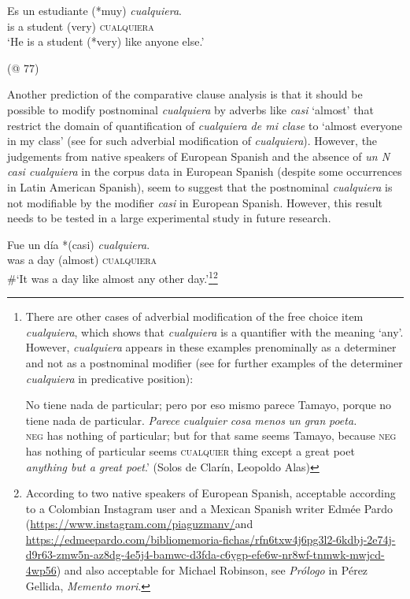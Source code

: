 {\ea \label{bkm:Ref58074686} %
\gll Es un estudiante (*muy) \textit{cualquiera}.\\
is a student (very) \textsc{cualquiera}\\
\glt ‘He is a student (*very) like anyone else.’

  (@ 77)
\z

\largerpage
Another prediction of the comparative clause analysis is that it should be possible to modify postnominal \textit{cualquiera} by adverbs like \textit{casi} ‘almost’ that restrict the domain of quantification of \textit{cualquiera de mi clase} to ‘almost everyone in my class’ (see  for such adverbial modification of \textit{cualquiera}). However, the judgements from native speakers of European Spanish and the absence of \textit{un N casi cualquiera} in the corpus data in European Spanish (despite some occurrences in Latin American Spanish), seem to suggest that the postnominal \textit{cualquiera} is not modifiable by the modifier \textit{casi} in European Spanish. However, this result needs to be tested in a large experimental study in future research.

\ea \label{ex:key:176} %
  \gll Fue un día *(casi) \textit{cualquiera}.\\
  was a day (almost) \textsc{cualquiera}\\
  \glt \#‘It was a day like almost any other day.’\footnote{{There
        are other cases of adverbial modification of the free choice item} {\textit{cualquiera}}{, which shows that} {\textit{cualquiera}} {is a quantifier with the meaning ‘any’. However,} {\textit{cualquiera}} {appears in these examples prenominally as a determiner and not as a postnominal modifier (see  for further examples of the determiner} {\textit{cualquiera}} {in predicative position):}

    \ea \gll No tiene nada de particular; pero por eso mismo parece Tamayo, porque no tiene nada de particular. \textit{Parece} \textit{cualquier} \textit{cosa} \textit{menos} \textit{un} \textit{gran} \textit{poeta.}\\
    \textsc{neg} has nothing of particular; but for that same seems Tamayo, because \textsc{neg} has nothing of particular seems \textsc{cualquier} thing except a great poet\\
     {\textit{anything but a great poet}}{.’} 
    {(Solos} {de} {Clarín}, {Leopoldo} {Alas)} 
    \z 
    }\footnote{According to two native speakers of European Spanish, acceptable according to a Colombian Instagram user and a Mexican Spanish writer Edmée Pardo ({\url{https://www.instagram.com/piaguzmanv/}{ {and}} \url{https://edmeepardo.com/bibliomemoria-fichas/rfn6txw4j6pg3l2-6kdbj-2e74j-d9r63-zmw5n-az8dg-4e5j4-bamwc-d3fda-c6ygp-efe6w-nr8wf-tnmwk-mwjcd-4wp56}) {} and also acceptable for Michael Robinson, see \textit{Prólogo} in Pérez Gellida, \textit{Memento mori}}.}
\z

}

